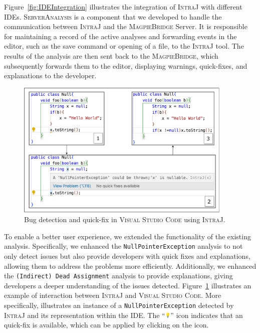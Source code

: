 Figure~\ref{fig:IDEIntegration} illustrates the integration of \textsc{IntraJ} with
different IDEs. \textsc{ServerAnalysis} is a component that we developed to handle the
communication between \textsc{IntraJ} and the \textsc{MagpieBridge} Server. It is responsible
for maintaining a record of the active analyses and forwarding events in the editor,
such as the save command or opening of a file, to the \textsc{IntraJ} tool.
The results of the analysis are then sent back to the \textsc{MagpieBridge}, which subsequently
forwards them to the editor, displaying warnings, quick-fixes, and explanations
to the developer.
\begin{figure}[ht]
  \centering
  \includegraphics[width=0.92\textwidth]{kappa/img/IDEExample.pdf}
  \caption{\label{fig:IDEExample} Bug detection and quick-fix in \textsc{Visual Studio Code} using \textsc{IntraJ}.}
\end{figure}
To enable a better user experience, we extended the functionality of the existing analysis.
Specifically, we enhanced the \texttt{NullPointerException} analysis to not only detect issues
but also provide developers with quick fixes and explanations, allowing them to address
the problems more efficiently. Additionally, we enhanced the \texttt{(Indirect) Dead Assignment} analysis
to provide explanations, giving developers a deeper understanding of the issues detected.
Figure~\ref{fig:IDEExample} illustrates an example of interaction between \textsc{IntraJ} and
\textsc{Visual Studio Code}. More specifically, illustrates an instance of a \texttt{NullPointerException} 
detected by \textsc{IntraJ} and its representation within the IDE. 
The ``\includegraphics[height=8pt]{kappa/img/bulb.png}''  icon indicates that an quick-fix is available,
which can be applied by clicking on the icon.

